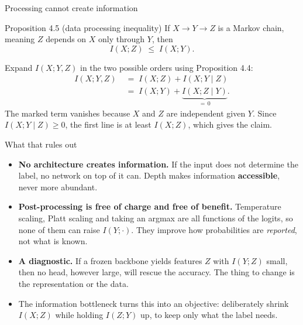 \documentclass[aspectratio=169,9pt]{beamer}
\newcommand{\orange}[1]{\textcolor{AmazonOrange}{\textbf{#1}}}
\newcommand{\blue}[1]{\textcolor{densityblue}{\textbf{#1}}}
\newcommand{\muted}[1]{\textcolor{EPICMuted}{#1}}
\begin{document}
\begin{frame}{Processing cannot create information}
\begin{block}{Proposition 4.5 (data processing inequality)}
If $X \to Y \to Z$ is a Markov chain, meaning $Z$ depends on $X$ only through $Y$, then
\[
    I(X;Z) \;\le\; I(X;Y).
\]
\end{block}
\pause
\vspace{0.1cm}
Expand $I(X; Y,Z)$ in the two possible orders using Proposition 4.4:
\vspace{-0.1cm}
\begin{align*}
    I(X; Y,Z) &\;=\; I(X;Z) + I(X;Y \mid Z) \\[0.15cm]
              &\;=\; I(X;Y) + \underbrace{I(X;Z \mid Y)}_{\textstyle =\,0} .
\end{align*}
\pause
\vspace{-0.1cm}
The marked term vanishes because $X$ and $Z$ are independent given $Y$. Since $I(X;Y \mid Z) \ge 0$, the
first line is at least $I(X;Z)$, which gives the claim.
\end{frame}

\begin{frame}{What that rules out}
\begin{itemize}
    \item \orange{No architecture creates information.} If the input does not determine the label, no network
    on top of it can. Depth makes information \blue{accessible}, never more abundant.
    \pause
    \item \orange{Post-processing is free of charge and free of benefit.} Temperature scaling, Platt scaling
    and taking an argmax are all functions of the logits, so none of them can raise $I(Y; \cdot)$. They improve
    how probabilities are \textit{reported}, not what is known.
    \pause
    \item \orange{A diagnostic.} If a frozen backbone yields features $Z$ with $I(Y;Z)$ small, then no head,
    however large, will rescue the accuracy. The thing to change is the representation or the data.
    \pause
    \item \muted{The information bottleneck turns this into an objective: deliberately shrink $I(X;Z)$ while
    holding $I(Z;Y)$ up, to keep only what the label needs.}
\end{itemize}
\end{frame}
\end{document}
